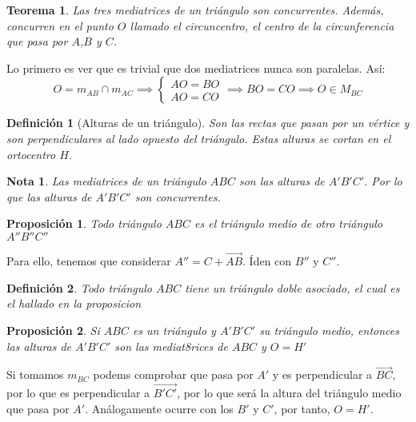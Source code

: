 \documentclass[11pt, a4paper, titlepage]{article}
\makeatletter
\renewenvironment{proof}[1][\proofname] {\vspace{-15pt}\par\pushQED{\qed}\normalfont\topsep6\p@\@plus6\p@\relax\trivlist\item[\hskip\labelsep\it#1\@addpunct{.}]\ignorespaces}{\popQED\endtrivlist\@endpefalse}
\renewcommand{\vec}{\overrightarrow}
\renewenvironment{proof}[1][\proofname] {\par\pushQED{\qed}\normalfont\topsep6\p@\@plus6\p@\relax\trivlist\item[\hskip\labelsep\itshape\sffamily#1\@addpunct{.}]\ignorespaces}{\popQED\endtrivlist\@endpefalse}
\theoremstyle{theorem-style}
\newtheorem{nth}{Teorema}[section]
\newtheorem{nprop}{Proposición}[section]
\theoremstyle{definition-style}
\newtheorem{ndef}{Definición}[section]
\theoremstyle{remark-style}
\newtheorem*{nota}{Nota}
\theoremstyle{example-style}
\makeatother
\begin{document}
\begin{nth}
  Las tres mediatrices de un triángulo son concurrentes. Además, concurren en el punto $O$ llamado el circuncentro, el centro de la circunferencia que pasa por $A$,$B$ y $C$.
\end{nth}
\begin{proof}
  Lo primero es ver que es trivial que dos mediatrices nunca son paralelas. Así:
  \[
    O = m_{AB} \cap m_{AC}\implies \begin{cases}
      AO = BO\\
      AO = CO
    \end{cases} \implies BO = CO \implies O \in M_{BC}
  \]
\end{proof}


\begin{ndef}[Alturas de un triángulo]
  Son las rectas que pasan por un vértice y son perpendiculares al lado opuesto del triángulo. Estas alturas se cortan en el ortocentro $H$.
\end{ndef}

\begin{nota}
  Las mediatrices de un triángulo $ABC$ son las alturas de $A'B'C'$. Por lo que las alturas de $A'B'C'$ son concurrentes.
\end{nota}

\begin{nprop}
  Todo triángulo $ABC$ es el triángulo medio de otro triángulo $A''B''C''$
\end{nprop}
\begin{proof}
  Para ello, tenemos que considerar $A'' = C+ \vec{AB}$. Íden con $B''$ y $C''$.
\end{proof}
\begin{ndef}
  Todo triángulo $ABC$ tiene un triángulo doble asociado, el cual es el hallado en la proposicion 
\end{ndef}


\begin{nprop}
  Si $ABC$ es un triángulo y $A'B'C'$ su triángulo medio, entonces las alturas de $A'B'C'$ son las mediat8rices de $ABC$ y $O=H'$
\end{nprop}
\begin{proof}
  Si tomamos $m_{BC}$ podems comprobar que pasa por $A'$ y es perpendicular a $\vec{BC}$, por lo que es perpendicular a $\vec{B'C'}$, por lo que será la altura del triángulo medio que pasa por $A'$. Análogamente ocurre con los $B'$ y $C'$, por tanto, $O=H'$.
\end{proof}
\end{document}
